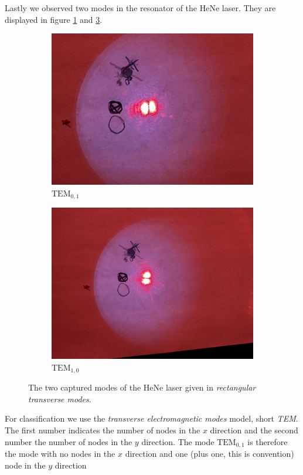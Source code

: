 \documentclass[../main.tex]{subfiles}
\begin{document}
    Lastly we observed two modes in the resonator of the HeNe laser. They are displayed in figure \ref{fig:TEM_0_1} and \ref{fig:TEM_1_0}.
    \begin{figure}[H]
        \centering
        \begin{subfigure}[b]{0.4\textwidth}
            \centering
            \includegraphics[angle=0,width=\textwidth]{Bilddateien/6/IMG_3497.jpeg}
            \caption{$\text{TEM}_{0,1}$}
            \label{fig:TEM_0_1}
        \end{subfigure}
        \begin{subfigure}[b]{0.4\textwidth}
            \centering
            \includegraphics[angle=180,width=\textwidth]{Bilddateien/6/IMG_3499.jpeg}
            \caption{$\text{TEM}_{1,0}$}
            \label{fig:TEM_1_0}
        \end{subfigure}
        \caption{The two captured modes of the HeNe laser given in \emph{rectangular transverse modes}.}
    \end{figure}
    For classification we use the \emph{transverse electromagnetic modes} model, short \emph{TEM}. The first number indicates the number of nodes in the $x$ direction and the second number the number of nodes in the $y$ direction. The mode $\text{TEM}_{0,1}$ is therefore the mode with no nodes in the $x$ direction and one (plus one, this is convention) node in the $y$ direction \cite[p. 13]{meos}
\end{document}
